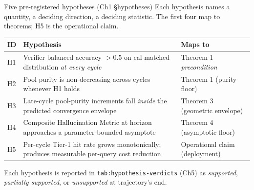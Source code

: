 \documentclass[10pt,aspectratio=169]{beamer}
\begin{document}
\begin{frame}{Five pre-registered hypotheses (Ch1 \S hypotheses)}
  \footnotesize
  Each hypothesis names a quantity, a deciding direction, a deciding statistic. The first four map to theorems; H5 is the operational claim.

  \vspace{0.4em}
  \begin{tabular}{@{}p{0.6cm}p{8.5cm}p{4cm}@{}}
    \toprule
    \textbf{ID} & \textbf{Hypothesis} & \textbf{Maps to} \\
    \midrule
    H1 & Verifier balanced accuracy $> 0.5$ on cal-matched distribution \emph{at every cycle} & Theorem 1 \emph{precondition} \\
    H2 & Pool purity is non-decreasing across cycles whenever H1 holds & Theorem 1 (purity floor) \\
    H3 & Late-cycle pool-purity increments fall \emph{inside} the predicted convergence envelope & Theorem 3 (geometric envelope) \\
    H4 & Composite Hallucination Metric at horizon approaches a parameter-bounded asymptote & Theorem 4 (asymptotic floor) \\
    H5 & Per-cycle Tier-1 hit rate grows monotonically; produces measurable per-query cost reduction & Operational claim (deployment) \\
    \bottomrule
  \end{tabular}

  \vspace{0.4em}
  {\scriptsize Each hypothesis is reported in \texttt{tab:hypothesis-verdicts} (Ch5) as \emph{supported}, \emph{partially supported}, or \emph{unsupported} at trajectory's end.}
\end{frame}
\end{document}
